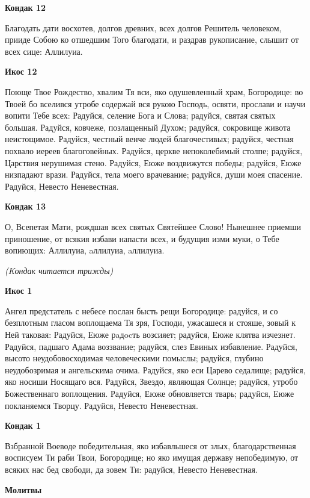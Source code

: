 \bfseries Кондак 12\normalfont{}


Благодать дати восхотев, долгов древних, всех долгов Решитель человеком, прииде Собою ко отшедшим Того благодати, и раздрав рукописание, слышит от всех сице: Аллилуиа.


\bfseries Икос 12\normalfont{}


Поюще Твое Рождество, хвалим Тя вси, яко одушевленный храм, Богородице: во Твоей бо вселився утробе содержай вся рукою Господь, освяти, прослави и научи вопити Тебе всех: Радуйся, селение Бога и Слова; радуйся, святая святых большая. Радуйся, ковчеже, позлащенный Духом; радуйся, сокровище живота неистощимое. Радуйся, честный венче людей благочестивых; радуйся, честная похвало иереев благоговейных. Радуйся, церкве непоколебимый столпе; радуйся, Царствия нерушимая стено. Радуйся, Еюже воздвижутся победы; радуйся, Еюже низпадают врази. Радуйся, тела моего врачевание; радуйся, души моея спасение. Радуйся, Невесто Неневестная.


\bfseries Кондак 13\normalfont{}


О, Всепетая Мати, рождшая всех святых Святейшее Слово! Нынешнее приемши приношение, от всякия избави напасти всех, и будущия изми муки, о Тебе вопиющих: Аллилуиа, aллилуиа, aллилуиа.


\itshape (Kондак читается трижды)\normalfont{}


\bfseries Икос 1\normalfont{}


Ангел предстатель с небесе послан бысть рещи Богородице: радуйся, и со безплотным гласом воплощаема Тя зря, Господи, ужасашеся и стояше, зовый к Ней таковая: Радуйся, Еюже рaдocть возсияет; радуйся, Еюже клятва изчезнет. Радуйся, падшаго Адама воззвание; радуйся, слез Евиных избавление. Радуйся, высото неудобовосходимая человеческими помыслы; радуйся, глубино неудобозримая и ангельскима очима. Радуйся, яко еси Царево седалище; радуйся, яко носиши Носящаго вся. Радуйся, Звездо, являющая Солнце; радуйся, утробо Божественнаго воплощения. Радуйся, Еюже обновляется тварь; радуйся, Еюже покланяемся Творцу. Радуйся, Невесто Неневестная.


\bfseries Кондак 1\normalfont{}


Взбранной Воеводе победительная, яко избавльшеся от злых, благодарственная восписуем Ти раби Твои, Богородице; но яко имущая державу непобедимую, от всяких нас бед свободи, да зовем Ти: радуйся, Невесто Неневестная.


\bfseries Молитвы\normalfont{}


